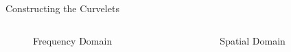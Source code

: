 \documentclass[mathserif]{beamer}
\begin{document}
\begin{frame}{Constructing the Curvelets}
    \begin{columns}
        \begin{column}{.5\textwidth}
            \begin{figure}
                
                \caption{Frequency Domain}
            \end{figure}
        \end{column}
        \begin{column}{.5\textwidth}
            \begin{figure}
                
                \caption{Spatial Domain}
            \end{figure}
        \end{column}
    \end{columns}
\end{frame}
\end{document}
